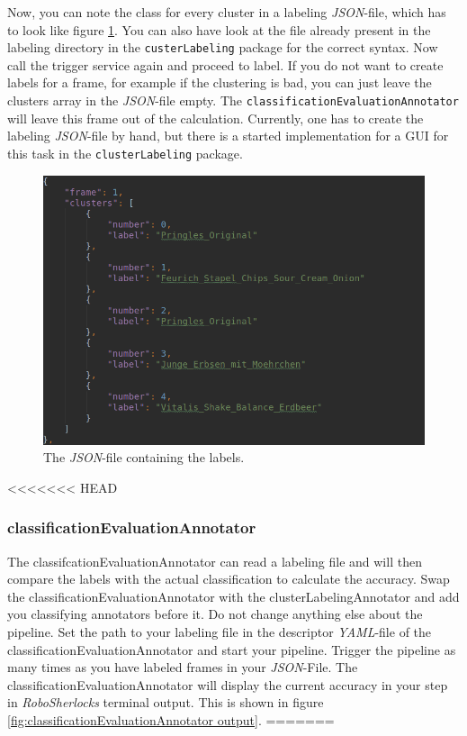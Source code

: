 \documentclass[main.tex]{subfiles}
\begin{document}
\newpage

Now, you can note the class for every cluster in a labeling \textit{JSON}-file, which has to look like figure \ref{fig:labeling file}. You can also have look at the file already present in the labeling directory in the \texttt{custerLabeling} package for the correct syntax. Now call the trigger service again and proceed to label. If you do not want to create labels for a frame, for example if the clustering is bad, you can just leave the clusters array in the \textit{JSON}-file empty. The \texttt{classificationEvaluationAnnotator} will leave this frame out of the calculation. Currently, one has to create the labeling \textit{JSON}-file by hand, but there is a started implementation for a GUI for this task in the \texttt{clusterLabeling} package.

\begin{figure}
  \includegraphics[width=\linewidth]{pictures/perception/labeling_file.png}
  \caption{The \textit{JSON}-file containing the labels.}
  \label{fig:labeling file}
\end{figure}


<<<<<<< HEAD
\subsubsection{classificationEvaluationAnnotator}\label{classificationEvaluationAnnotator}
The classifcationEvaluationAnnotator can read a labeling file and will then compare the labels with the actual classification to calculate the accuracy. Swap the classificationEvaluationAnnotator with the clusterLabelingAnnotator and add you classifying annotators before it. Do not change anything else about the pipeline. Set the path to your labeling file in the descriptor \textit{YAML}-file of the classificationEvaluationAnnotator and start your pipeline. Trigger the pipeline as many times as you have labeled frames in your \textit{JSON}-File. The classificationEvaluationAnnotator will display the current accuracy in your step in \textit{RoboSherlocks} terminal output. This is shown in figure \ref{fig:classificationEvaluationAnnotator output}.
=======
\end{document}
